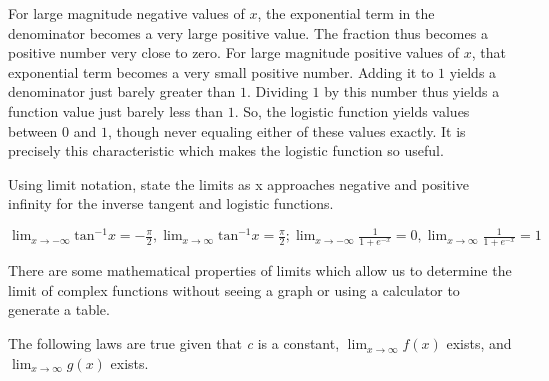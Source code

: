 
For large magnitude negative values of $x$, the exponential term in the denominator becomes a very large positive value. The fraction thus becomes a positive number very close to zero. For large magnitude positive values of $x$, that exponential term becomes a very small positive number. Adding it to $1$ yields a denominator just barely greater than $1$. Dividing $1$ by this number thus yields a function value just barely less than $1$. So, the logistic function yields values between $0$ and $1$, though never equaling either of these values exactly. It is precisely this characteristic which makes the logistic function so useful.

\begin{Exercise}[title=Limits Practice 3, label=limits3]
Using limit notation, state the limits as x approaches negative and positive infinity for the inverse tangent and logistic functions.
  \vspace{40mm}
\end{Exercise}
\begin{Answer}[ref=limits3] 
	$ \lim_{x \rightarrow -\infty} \text{tan}^{-1}x = -\frac{\pi}{2}, \lim_{x \rightarrow \infty} \text{tan}^{-1}x = \frac{\pi}{2}; \lim_{x \rightarrow -\infty} \frac{1}{1 + e^{-x}} = 0, \lim_{x \rightarrow \infty} \frac{1}{1 + e^{-x}} = 1 $
\end{Answer}

There are some mathematical properties of limits which allow us to determine the limit of complex functions without seeing a graph or using a calculator to generate a table. 

The following laws are true given that \textit{c} is a constant, $\lim_{x\to\infty} f(x) $ exists, and $\lim_{x\to\infty} g(x) $ exists.

